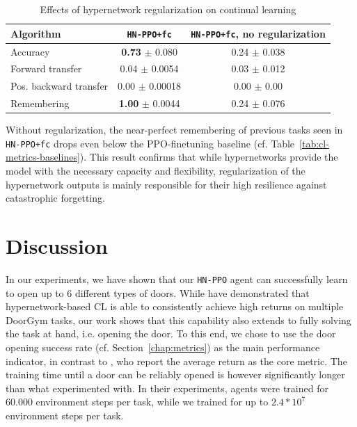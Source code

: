 \documentclass[dvipsnames]{article} %
\newcommand{\commentOLD}[1]{}
\newcommand{\asOLD}[1] {\commentOLD{{\color{orange} AS: #1}}}              %
\begin{document}
\begin{table}[tb]
\caption{Effects of hypernetwork regularization on continual learning}
\label{tab:ablation-results}
\begin{center}
\begin{tabular}{@{}lcc@{}}
\toprule
Algorithm & \texttt{HN-PPO+fc} & \texttt{HN-PPO+fc}, no regularization \\ 
\midrule
Accuracy               &  \textbf{0.73} $\pm$ 0.080 & 0.24 $\pm$ 0.038\\
Forward transfer       &  0.04 $\pm$ 0.0054 & 0.03 $\pm$ 0.012\\
Pos. backward transfer &  0.00 $\pm$ 0.00018& 0.00 $\pm$ 0.00\\
Remembering            &  \textbf{1.00} $\pm$ 0.0044& 0.24 $\pm$ 0.076\\
\bottomrule
\end{tabular}
\end{center}
\end{table}

Without regularization, the near-perfect remembering of previous tasks seen in \texttt{HN-PPO+fc} drops even below the PPO-finetuning baseline (cf. Table~\ref{tab:cl-metrics-baselines}). This result confirms that while hypernetworks provide the model with the necessary capacity and flexibility, regularization of the hypernetwork outputs is mainly responsible for their high resilience against catastrophic forgetting.

\section{Discussion}
\asOLD{Start with summarizing what you did, this paragraph comes as too abrupt.} 
In our experiments, we have shown that our \texttt{HN-PPO} agent can successfully learn to open up to 6 different types of doors. While \citet{MBRLHypernetworks} have demonstrated that hypernetwork-based CL is able to consistently achieve high returns on multiple DoorGym tasks, our work shows that this capability also extends to fully solving the task at hand, i.e. opening the door. To this end, we chose to use the door opening success rate (cf. Section~\ref{chap:metrics}) as the main performance indicator, in contrast to \citet{MBRLHypernetworks}, who report the average return as the core metric. 
The training time until a door can be reliably opened is however significantly longer than what \citet{MBRLHypernetworks} experimented with. In their experiments, agents were trained for 60.000 environment steps per task, while we trained for up to $2.4*10^7$ environment steps per task. 
\end{document}
